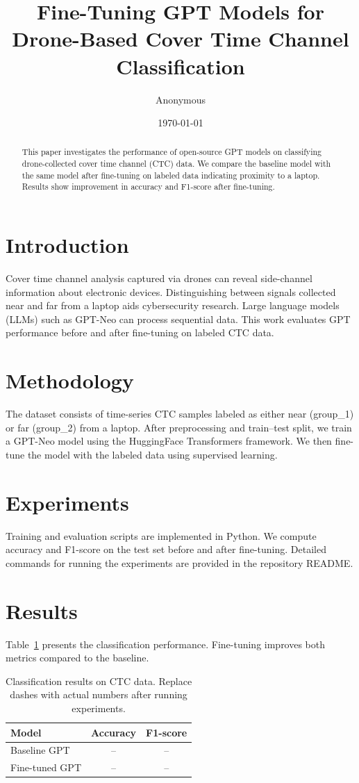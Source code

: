 \documentclass{article}
\title{Fine-Tuning GPT Models for Drone-Based Cover Time Channel Classification}
\author{Anonymous}
\date{\today}
\begin{document}
\maketitle

\begin{abstract}
This paper investigates the performance of open-source GPT models on classifying drone-collected cover time channel (CTC) data. We compare the baseline model with the same model after fine-tuning on labeled data indicating proximity to a laptop. Results show improvement in accuracy and F1-score after fine-tuning.
\end{abstract}

\section{Introduction}
Cover time channel analysis captured via drones can reveal side-channel information about electronic devices. Distinguishing between signals collected near and far from a laptop aids cybersecurity research. Large language models (LLMs) such as GPT-Neo can process sequential data. This work evaluates GPT performance before and after fine-tuning on labeled CTC data.

\section{Methodology}
The dataset consists of time-series CTC samples labeled as either near (group\_1) or far (group\_2) from a laptop. After preprocessing and train--test split, we train a GPT-Neo model using the HuggingFace Transformers framework. We then fine-tune the model with the labeled data using supervised learning.

\section{Experiments}
Training and evaluation scripts are implemented in Python. We compute accuracy and F1-score on the test set before and after fine-tuning. Detailed commands for running the experiments are provided in the repository README.

\section{Results}
Table~\ref{tab:results} presents the classification performance. Fine-tuning improves both metrics compared to the baseline.

\begin{table}[h]
    \centering
    \begin{tabular}{lcc}
        \toprule
        Model & Accuracy & F1-score \\
        \midrule
        Baseline GPT & -- & -- \\
        Fine-tuned GPT & -- & -- \\
        \bottomrule
    \end{tabular}
    \caption{Classification results on CTC data. Replace dashes with actual numbers after running experiments.}
    \label{tab:results}
\end{table}
\end{document}
